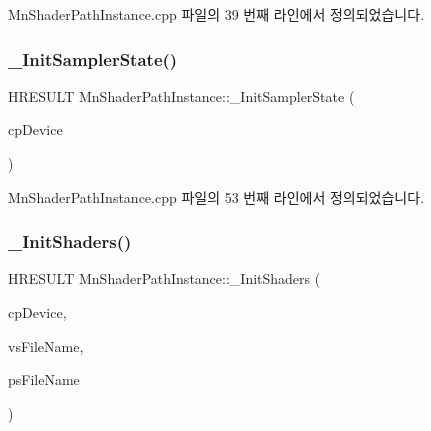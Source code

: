 Mn\+Shader\+Path\+Instance.\+cpp 파일의 39 번째 라인에서 정의되었습니다.

\mbox{\label{class_m_n_l_1_1_mn_shader_path_instance_addb282448e424f98db7fc6cabc8c837a}} 
\subsubsection{\texorpdfstring{\+\_\+\+Init\+Sampler\+State()}{\_InitSamplerState()}}
{\footnotesize\ttfamily H\+R\+E\+S\+U\+LT Mn\+Shader\+Path\+Instance\+::\+\_\+\+Init\+Sampler\+State (\begin{DoxyParamCaption}\item[{const \hyperlink{namespace_m_n_l_a1eec210db8f309a4a9ac0d9658784c31}{C\+P\+D3\+D\+Device} \&}]{cp\+Device }\end{DoxyParamCaption})\hspace{0.3cm}{\ttfamily [protected]}}



Mn\+Shader\+Path\+Instance.\+cpp 파일의 53 번째 라인에서 정의되었습니다.

\mbox{\label{class_m_n_l_1_1_mn_shader_path_instance_a3377d96f2cc09e9a42b5c1f2dc0597c5}} 
\subsubsection{\texorpdfstring{\+\_\+\+Init\+Shaders()}{\_InitShaders()}}
{\footnotesize\ttfamily H\+R\+E\+S\+U\+LT Mn\+Shader\+Path\+Instance\+::\+\_\+\+Init\+Shaders (\begin{DoxyParamCaption}\item[{const \hyperlink{namespace_m_n_l_a1eec210db8f309a4a9ac0d9658784c31}{C\+P\+D3\+D\+Device} \&}]{cp\+Device,  }\item[{const std\+::wstring \&}]{vs\+File\+Name,  }\item[{const std\+::wstring \&}]{ps\+File\+Name }\end{DoxyParamCaption})\hspace{0.3cm}{\ttfamily [protected]}}



